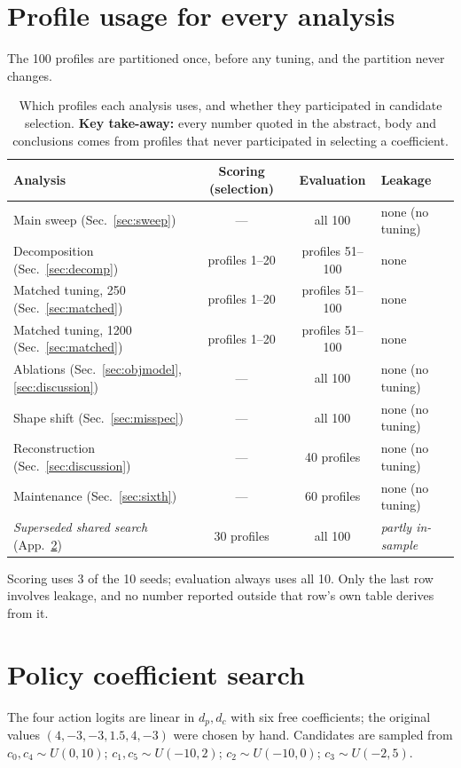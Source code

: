\documentclass{article}
\begin{document}
\section{Profile usage for every analysis}
\label{app:splits}

The 100 profiles are partitioned once, before any tuning, and the partition never changes.

\begin{table}[H]
  \caption{Which profiles each analysis uses, and whether they participated in candidate selection. \textbf{Key take-away:} every number quoted in the abstract, body and conclusions comes from profiles that never participated in selecting a coefficient.}
  \centering\small
  \begin{tabular}{lccl}
    \toprule
    Analysis & Scoring (selection) & Evaluation & Leakage \\
    \midrule
    Main sweep (Sec.~\ref{sec:sweep}) & --- & all 100 & none (no tuning) \\
    Decomposition (Sec.~\ref{sec:decomp}) & profiles 1--20 & profiles 51--100 & none \\
    Matched tuning, 250 (Sec.~\ref{sec:matched}) & profiles 1--20 & profiles 51--100 & none \\
    Matched tuning, 1200 (Sec.~\ref{sec:matched}) & profiles 1--20 & profiles 51--100 & none \\
    Ablations (Sec.~\ref{sec:objmodel}, \ref{sec:discussion}) & --- & all 100 & none (no tuning) \\
    Shape shift (Sec.~\ref{sec:misspec}) & --- & all 100 & none (no tuning) \\
    Reconstruction (Sec.~\ref{sec:discussion}) & --- & 40 profiles & none (no tuning) \\
    Maintenance (Sec.~\ref{sec:sixth}) & --- & 60 profiles & none (no tuning) \\
    \midrule
    \emph{Superseded shared search} (App.~\ref{app:coefsearch}) & 30 profiles & all 100 & \emph{partly in-sample} \\
    \bottomrule
  \end{tabular}
\end{table}

Scoring uses 3 of the 10 seeds; evaluation always uses all 10. Only the last row involves leakage, and no number reported outside that row's own table derives from it.

\section{Policy coefficient search}
\label{app:coefsearch}
The four action logits are linear in $d_p,d_c$ with six free coefficients; the original values $(4,-3,-3,1.5,4,-3)$ were chosen by hand. Candidates are sampled from $c_0,c_4\sim U(0,10)$; $c_1,c_5\sim U(-10,2)$; $c_2\sim U(-10,0)$; $c_3\sim U(-2,5)$.
\end{document}
